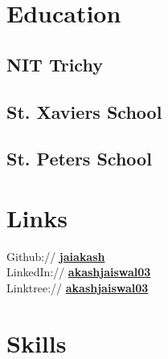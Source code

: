 \documentclass[]{deedy-resume-openfont}
\begin{document}
    
%
%

 
\begin{minipage}[t]{0.3\textwidth}

%
%
\section{Education}

\subsection{NIT Trichy}
\sectionsep

\subsection{St. Xavier\textquotesingle{}s School}
\sectionsep

\subsection{St. Peter\textquotesingle{}s School}
\sectionsep
  


\section{Links} 
Github:// \href{https://github.com/jaiakash}{\bf jaiakash} \\
LinkedIn://  \href{https://www.linkedin.com/in/akashjaiswal03}{\bf akashjaiswal03} \\
Linktree://  \href{https://linktr.ee/akashjaiswal03}{\bf akashjaiswal03} \\

%
%

\section{Skills}

\end{minipage}
\end{document}
